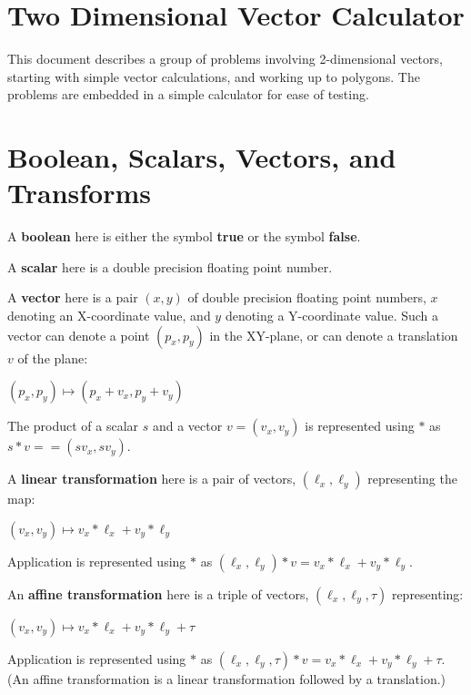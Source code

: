 \documentclass[12pt]{article}
\begin{document}
\newcommand{\header}[1]{\underline{\bf #1}}
\newcommand{\file}[1]{{\bf #1}}
\newcommand{\blankpage}{\newpage\vspace*{3.5in}%
    \centerline{\Large This Page is Intentionally Left Blank}}
\setlength{\parindent}{0.0in}
\setlength{\parskip}{1ex}
\newcommand{\key}[1]{{\bf #1}}
\newcommand{\TT}[1]{{\tt \bfseries #1}}
\newcommand{\EOL}{\penalty \exhyphenpenalty}
\newtheorem{definition}{Definition}[section]
\newtheorem{lemma}[definition]{Lemma}
\newenvironment{indpar}[1]%
    {\begin{list}{}{\setlength{\leftmargin}{#1}}\item[]}%
    {\end{list}}

\section{Two Dimensional Vector Calculator}
This document describes a group of problems involving 2-dimensional vectors,
starting with simple vector calculations, and working up to polygons.
The problems are embedded in a simple calculator for ease of
testing.

\section{Boolean, Scalars, Vectors, and Transforms}
A \key{boolean} here is either the symbol \key{true} or the symbol \key{false}.

A \key{scalar} here is a double precision floating point number.

A \key{vector} here is a pair $(x,y)$ of double precision floating point
numbers, $x$ denoting an X-coordinate value, and $y$ denoting a
Y-coordinate value.  Such a vector can denote a point $(p_x,p_y)$ in the
XY-plane, or can denote a translation $v$ of the plane:
\centerline{$(p_x,p_y) \longmapsto (p_x+v_x,p_y+v_y)$}

The product of a scalar $s$ and a vector $v=(v_x,v_y)$ is represented using
$*$ as $s*v == (sv_x,sv_y)$.

A \key{linear transformation} here is a pair of vectors, $(\ell_x,\ell_y)$
representing the map:
\centerline{$(v_x,v_y) \longmapsto v_x*\ell_x+v_y*\ell_y$}
Application is represented using
$*$ as $(\ell_x,\ell_y)*v=v_x*\ell_x+v_y*\ell_y$.

An \key{affine transformation} here is a triple of vectors,
$(\ell_x,\ell_y,\tau)$
representing: \\
\centerline{$(v_x,v_y) \longmapsto v_x*\ell_x+v_y*\ell_y+\tau$}
Application is represented using
$*$ as $(\ell_x,\ell_y,\tau)*v=v_x*\ell_x+v_y*\ell_y+\tau$. \\
(An affine transformation is a linear transformation followed by
a translation.)
\end{document}
